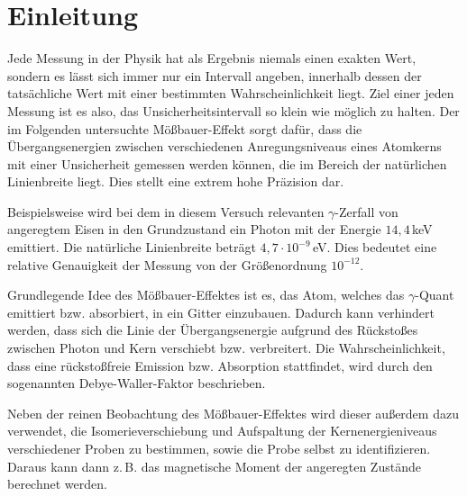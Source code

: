 \section{Einleitung}

Jede Messung in der Physik hat als Ergebnis niemals einen exakten Wert, sondern es lässt sich immer nur ein Intervall angeben, innerhalb dessen der tatsächliche Wert mit einer bestimmten Wahrscheinlichkeit liegt.\cite{gum} Ziel einer jeden Messung ist es also, das Unsicherheitsintervall so klein wie möglich zu halten. Der im Folgenden untersuchte Mößbauer-Effekt sorgt dafür, dass die Übergangsenergien zwischen verschiedenen Anregungsniveaus eines Atomkerns mit einer Unsicherheit gemessen werden können, die im Bereich der natürlichen Linienbreite liegt. Dies stellt eine extrem hohe Präzision dar. 

Beispielsweise wird bei dem in diesem Versuch relevanten $\gamma$-Zerfall von angeregtem Eisen in den Grundzustand ein Photon mit der Energie $14,4\,$keV emittiert. Die natürliche Linienbreite beträgt $4,7\cdot 10^{-9}\,$eV. Dies bedeutet eine relative Genauigkeit der Messung von der Größenordnung $10^{-12}$.\cite{schatz}

Grundlegende Idee des Mößbauer-Effektes ist es, das Atom, welches das $\gamma$-Quant emittiert bzw. absorbiert, in ein Gitter einzubauen. Dadurch kann verhindert werden, dass sich die Linie der Übergangsenergie aufgrund des Rückstoßes zwischen Photon und Kern verschiebt bzw. verbreitert. Die Wahrscheinlichkeit, dass eine rückstoßfreie Emission bzw. Absorption stattfindet, wird durch den sogenannten Debye-Waller-Faktor beschrieben.

Neben der reinen Beobachtung des Mößbauer-Effektes wird dieser außerdem dazu verwendet, die Isomerieverschiebung und Aufspaltung der Kernenergieniveaus verschiedener Proben zu bestimmen, sowie die Probe selbst zu identifizieren. Daraus kann dann z.\,B. das magnetische Moment der angeregten Zustände berechnet werden.



